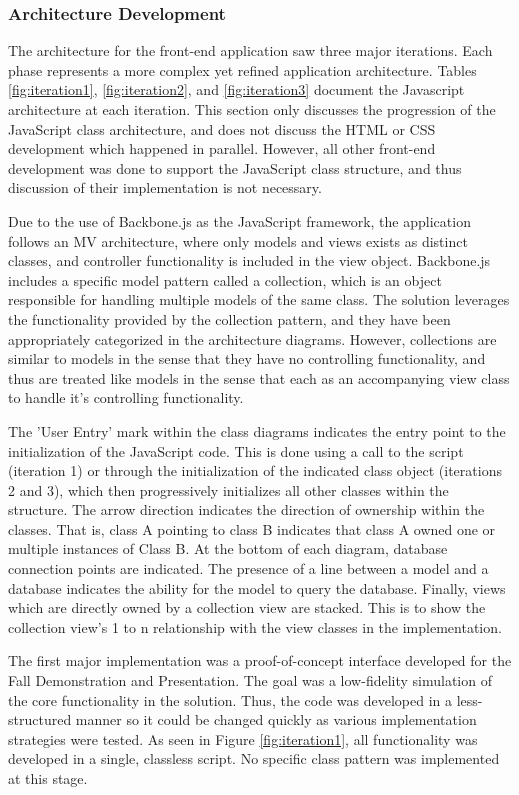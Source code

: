 \documentclass{report}
\begin{document}
\subsubsection{Architecture Development}

The architecture for the front-end application saw three major iterations. Each phase represents a more complex yet refined application architecture. Tables \ref{fig:iteration1}, \ref{fig:iteration2}, and \ref{fig:iteration3} document the Javascript architecture at each iteration. This section only discusses the progression of the JavaScript class architecture, and does not discuss the HTML or CSS development which happened in parallel. However, all other front-end development was done to support the JavaScript class structure, and thus discussion of their implementation is not necessary.

Due to the use of Backbone.js as the JavaScript framework, the application follows an MV architecture, where only models and views exists as distinct classes, and controller functionality is included in the view object. Backbone.js includes a specific model pattern called a collection, which is an object responsible for handling multiple models of the same class. The solution leverages the functionality provided by the collection pattern, and they have been appropriately categorized in the architecture diagrams. However, collections are similar to models in the sense that they have no controlling functionality, and thus are treated like models in the sense that each as an accompanying view class to handle it's controlling functionality.

The 'User Entry' mark within the class diagrams indicates the entry point to the initialization of the JavaScript code. This is done using a call to the script (iteration 1) or through the initialization of the indicated class object (iterations 2 and 3), which then progressively initializes all other classes within the structure. The arrow direction indicates the direction of ownership within the classes. That is, class A pointing to class B indicates that class A owned one or multiple instances of Class B. At the bottom of each diagram, database connection points are indicated. The presence of a line between a model and a database indicates the ability for the model to query the database. Finally, views which are directly owned by a collection view are stacked. This is to show the collection view's 1 to n relationship with the view classes in the implementation.

The first major implementation was a proof-of-concept interface developed for the Fall Demonstration and Presentation. The goal was a low-fidelity simulation of the core functionality in the solution. Thus, the code was developed in a less-structured manner so it could be changed quickly as various implementation strategies were tested. As seen in Figure \ref{fig:iteration1}, all functionality was developed in a single, classless script. No specific class pattern was implemented at this stage.
\end{document}

